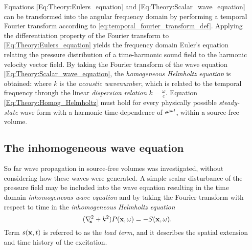 \vspace{3mm}
%
Equations \eqref{Eq:Theory:Eulers_equation} and \eqref{Eq:Theory:Scalar_wave_equation} can be transformed into the angular frequency domain by performing a temporal Fourier transform according to \eqref{eq:temporal_fourier_transform_def}.
Applying the differentiation property of the Fourier transform to \eqref{Eq:Theory:Eulers_equation} yields the frequency domain Euler's equation
relating the pressure distribution of a time-harmonic sound field to the harmonic velocity vector field.
By taking the Fourier transform of the wave equation \eqref{Eq:Theory:Scalar_wave_equation}, the \emph{homogeneous Helmholtz equation} is obtained:
where $k$ is the \emph{acoustic wavenumber}, which is related to the temporal frequency through the linear \emph{dispersion relation} $k = \frac{\omega}{c}$.
%
Equation \eqref{Eq:Theory:Homog_Helmholtz} must hold for every physically possible \emph{steady-state} wave form with a harmonic time-dependence of $\mathrm{e}^{\mathrm{j} \omega t}$, within a source-free volume. 

\subsection{The inhomogeneous wave equation}
%
So far wave propagation in source-free volumes was investigated, without considering how these waves were generated.
A simple scalar disturbance of the pressure field may be included into the wave equation resulting in the time domain \emph{inhomogeneous wave equation}  
and by taking the Fourier transform with respect to time in the \emph{inhomogeneous Helmholtz equation}
\begin{equation}
(\nabla^2_{\!\!\mathbf{x}} + k^2 ) P(\mathbf{x},\omega ) = -S(\mathbf{x},\omega).
\end{equation}
Term $s(\mathbf{x},t)$ is referred to as the \emph{load term}, and it describes the spatial extension and time history of the excitation.

